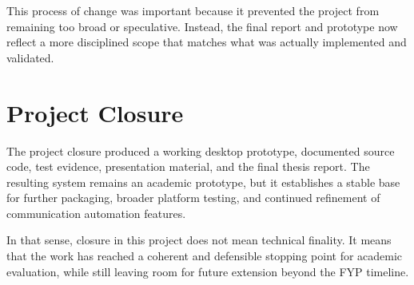This process of change was important because it prevented the project from remaining too broad or speculative. Instead, the final report and prototype now reflect a more disciplined scope that matches what was actually implemented and validated.

\section{Project Closure}
The project closure produced a working desktop prototype, documented source code, test evidence, presentation material, and the final thesis report. The resulting system remains an academic prototype, but it establishes a stable base for further packaging, broader platform testing, and continued refinement of communication automation features.

In that sense, closure in this project does not mean technical finality. It means that the work has reached a coherent and defensible stopping point for academic evaluation, while still leaving room for future extension beyond the FYP timeline.
